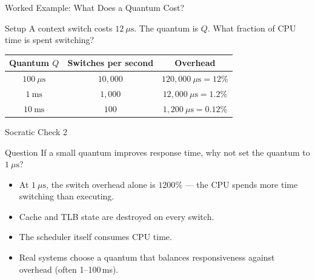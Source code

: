 \documentclass[aspectratio=169]{beamer}
\begin{document}
\begin{frame}{Worked Example: What Does a Quantum Cost?}
  \begin{exampleblock}{Setup}
    A context switch costs $12\ \mu\text{s}$. The quantum is $Q$. What
    fraction of CPU time is spent switching?
  \end{exampleblock}
  \begin{center}
    \renewcommand{\arraystretch}{1.35}
    \begin{tabular}{c|c|c}
      \textbf{Quantum $Q$} & \textbf{Switches per second} & \textbf{Overhead} \\
      \hline
      $100\ \mu\text{s}$ & $10{,}000$ & $120{,}000\ \mu\text{s} = 12\%$ \\
      $1\ \text{ms}$     & $1{,}000$  & $12{,}000\ \mu\text{s} = 1.2\%$ \\
      $10\ \text{ms}$    & $100$      & $1{,}200\ \mu\text{s} = 0.12\%$ \\
    \end{tabular}
  \end{center}
  \vspace{0.1cm}
\end{frame}

\begin{frame}{Socratic Check 2}
  \begin{block}{Question}
    If a small quantum improves response time, why not set the quantum to
    $1\ \mu\text{s}$?
  \end{block}
  \vspace{0.25cm}
  \begin{itemize}
    \item At $1\ \mu\text{s}$, the switch overhead alone is $1200\%$ --- the
      CPU spends more time switching than executing.
    \item Cache and TLB state are destroyed on every switch.
    \item The scheduler itself consumes CPU time.
    \item Real systems choose a quantum that balances responsiveness against
      overhead (often 1--100\,ms).
  \end{itemize}
\end{frame}

\end{document}
